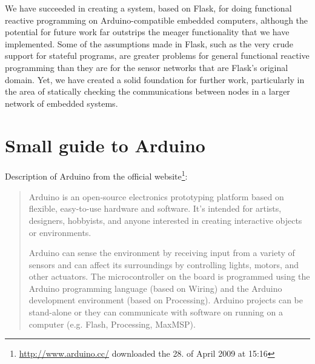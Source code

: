 \documentclass[a4paper, oneside, final]{memoir}
\begin{document}
We have succeeded in creating a system, based on Flask, for doing
functional reactive programming on Arduino-compatible embedded
computers, although the potential for future work far outstrips the
meager functionality that we have implemented.  Some of the
assumptions made in Flask, such as the very crude support for stateful
programs, are greater problems for general functional reactive
programming than they are for the sensor networks that are Flask's
original domain.  Yet, we have created a solid foundation for further
work, particularly in the area of statically checking the
communications between nodes in a larger network of embedded systems.




\appendix

\chapter{Small guide to Arduino}

Description of Arduino from the official
website\footnote{\url{http://www.arduino.cc/} downloaded the 28. of April 2009 at 15:16}:
\begin{quotation}
  Arduino is an open-source electronics prototyping platform based on
  flexible, easy-to-use hardware and software. It's intended for
  artists, designers, hobbyists, and anyone interested in creating
  interactive objects or environments.

  Arduino can sense the environment by receiving input from a variety
  of sensors and can affect its surroundings by controlling lights,
  motors, and other actuators. The microcontroller on the board is
  programmed using the Arduino programming language (based on Wiring)
  and the Arduino development environment (based on
  Processing). Arduino projects can be stand-alone or they can
  communicate with software on running on a computer (e.g. Flash,
  Processing, MaxMSP).
\end{quotation}
\end{document}
